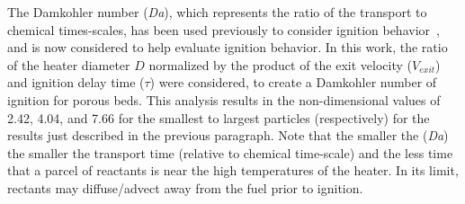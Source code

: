     The Damkohler number (\textit{Da}), which represents the ratio of the transport to chemical times-scales, has been used previously to consider ignition behavior~\cite{Dai2013}, and is now considered to help evaluate ignition behavior.  In this work, the ratio of the heater diameter $D$ normalized by the product of the exit velocity ($V_{exit}$) and ignition delay time ($\tau$) were considered, to create a Damkohler number of ignition for porous beds. This analysis results in the non-dimensional values of 2.42, 4.04, and 7.66 for the smallest to largest particles (respectively) for the results just described in the previous paragraph. Note that the smaller the (\textit{Da}) the smaller the transport time (relative to chemical time-scale) and the less time that a parcel of reactants is near the high temperatures of the heater. In its limit, rectants may diffuse/advect away from the fuel prior to ignition.
